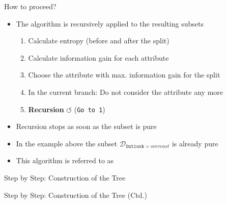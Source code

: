 \begin{frame}{How to proceed?}{}
	\begin{itemize}
		\item The algorithm is recursively applied to the resulting subsets
		\begin{enumerate}
			\item Calculate entropy (before and after the split)
			\item Calculate information gain for each attribute 
			\item Choose the attribute with max. information gain for the split
			\item In the current branch: Do not consider the attribute any more
			\item \textbf{Recursion} $\bm{\circlearrowleft}$ (\texttt{Go to 1})
		\end{enumerate}
		\item Recursion stops as soon as the subset is pure
		\item In the example above the subset $\mathcal{D}_{\texttt{Outlook}=overcast}$ is already pure
		\item This algorithm is referred to as 
	\end{itemize}
\end{frame}


\begin{frame}{Step by Step: Construction of the Tree}{}
	
\end{frame}


\begin{frame}{Step by Step: Construction of the Tree (Ctd.)}{}
	
\end{frame}


